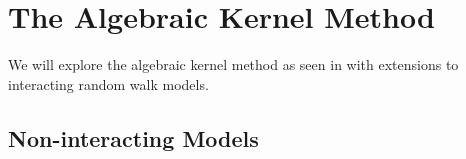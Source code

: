 
\chapter{The Algebraic Kernel Method}
\label{ch:AKM}

We will explore the algebraic kernel method as seen in \cite{bostan2014three} with extensions to interacting random walk models.

\section{Non-interacting Models}
